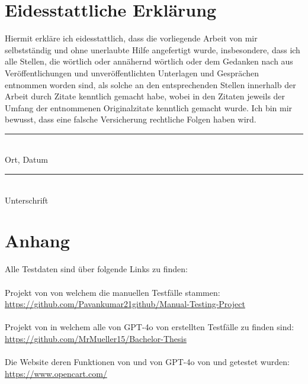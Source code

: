 \documentclass[12pt,toc=bib,toc=listof]{scrreprt}
\begin{document}
\chapter*{Eidesstattliche Erklärung} %
\label{sec:eidesstattlicheErklärung}
Hiermit erkläre ich eidesstattlich, dass die vorliegende Arbeit von mir selbstständig und ohne unerlaubte Hilfe angefertigt wurde, insbesondere, dass ich alle Stellen, die wörtlich oder annähernd wörtlich oder dem Gedanken nach aus Veröffentlichungen und unveröffentlichten Unterlagen und Gesprächen entnommen worden sind, als solche an den entsprechenden Stellen innerhalb der Arbeit durch Zitate kenntlich gemacht habe, wobei in den Zitaten jeweils der Umfang der entnommenen Originalzitate kenntlich gemacht wurde. Ich bin mir bewusst, dass eine falsche Versicherung rechtliche Folgen haben wird.
\newline
\newline
\newline
\newline
\noindent
\begin{minipage}[t]{0.4\textwidth} 
    \centering 
    \rule{\textwidth}{0.4pt} \\ 
    Ort, Datum
\end{minipage}%
\hfill
\begin{minipage}[t]{0.4\textwidth} 
    \centering 
    \rule{\textwidth}{0.4pt} \\ 
    Unterschrift
\end{minipage}

\chapter*{Anhang} %
\label{sec:anhang}
Alle Testdaten sind über folgende Links zu finden:\\
\\
Projekt von \textcite{Pavankumar21github2022} von welchem die manuellen Testfälle stammen: \url{https://github.com/Pavankumar21github/Manual-Testing-Project}\\
\\
Projekt von \textcite{Müller2025} in welchem alle von GPT-4o von \textcite{OpenAI2025} erstellten Testfälle zu finden sind: \url{https://github.com/MrMueller15/Bachelor-Thesis}\\
\\
Die Website \textcite{OpenCart2025} deren Funktionen von \textcite{Pavankumar21github2022} und von GPT-4o von \textcite{OpenAI2025} und getestet wurden: \url{https://www.opencart.com/}

\end{document}
